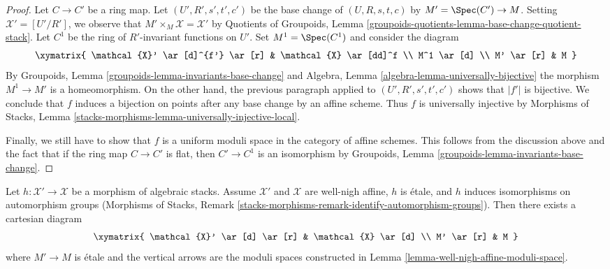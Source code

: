 \begin{proof}
\medskip\noindent
Let $C \to C'$ be a ring map. Let $(U', R', s', t', c')$ be
the base change of $(U, R, s, t, c)$ by $M' = \Spec(C') \to M$.
Setting $\mathcal{X}' = [U'/R']$, we observe that
$M' \times_M \mathcal{X} = \mathcal{X}'$ by
Quotients of Groupoids, Lemma
\ref{groupoids-quotients-lemma-base-change-quotient-stack}.
Let $C^1$ be the ring of $R'$-invariant functions on $U'$.
Set $M^1 = \Spec(C^1)$ and consider the diagram
$$
\xymatrix{
\mathcal{X}' \ar[d]^{f'} \ar[r] & \mathcal{X} \ar[dd]^f \\
M^1 \ar[d] \\
M' \ar[r] & M
}
$$
By Groupoids, Lemma \ref{groupoids-lemma-invariants-base-change} and
Algebra, Lemma \ref{algebra-lemma-universally-bijective}
the morphism $M^1 \to M'$ is a homeomorphism.
On the other hand, the previous paragraph applied to
$(U', R', s', t', c')$ shows that $|f'|$ is bijective.
We conclude that $f$ induces a bijection on points after any
base change by an affine scheme. Thus $f$ is universally injective
by Morphisms of Stacks, Lemma
\ref{stacks-morphisms-lemma-universally-injective-local}.

\medskip\noindent
Finally, we still have to show that $f$ is a uniform moduli space
in the category of affine schemes. This follows from the discussion
above and the fact that if the
ring map $C \to C'$ is flat, then $C' \to C^1$ is an isomorphism
by Groupoids, Lemma \ref{groupoids-lemma-invariants-base-change}.
\end{proof}

\begin{lemma}
\label{lemma-well-nigh-affine-moduli-space-etale}
Let $h : \mathcal{X}' \to \mathcal{X}$ be a morphism of algebraic stacks.
Assume $\mathcal{X}'$ and $\mathcal{X}$ are well-nigh affine,
$h$ is \'etale, and $h$ induces isomorphisms on automorphism groups
(Morphisms of Stacks, Remark
\ref{stacks-morphisms-remark-identify-automorphism-groups}).
Then there exists a cartesian diagram
$$
\xymatrix{
\mathcal{X}' \ar[d] \ar[r] & \mathcal{X} \ar[d] \\
M' \ar[r] & M
}
$$
where $M' \to M$ is \'etale and
the vertical arrows are the moduli spaces constructed in
Lemma \ref{lemma-well-nigh-affine-moduli-space}.
\end{lemma}

